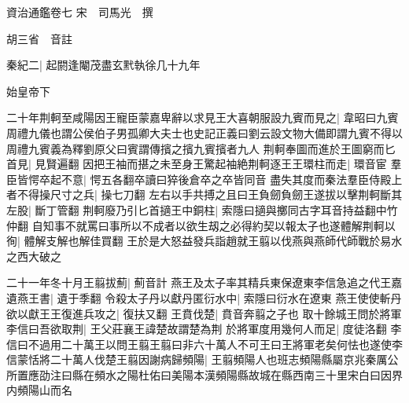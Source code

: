 資治通鑑卷七
宋　司馬光　撰

胡三省　音註

秦紀二|{
	起閼逢閹茂盡玄黓執徐几十九年}


始皇帝下

二十年荆軻至咸陽因王寵臣蒙嘉卑辭以求見王大喜朝服設九賓而見之|{
	韋昭曰九賓周禮九儀也謂公侯伯子男孤卿大夫士也史記正義曰劉云設文物大備即謂九賓不得以周禮九賓義為釋劉原父曰賓謂傳擯之擯九賓擯者九人}
荆軻奉圖而進於王圖窮而匕首見|{
	見賢遍翻}
因把王袖而揕之未至身王驚起袖絶荆軻逐王王環柱而走|{
	環音宦}
羣臣皆愕卒起不意|{
	愕五各翻卒讀曰猝後倉卒之卒皆同音}
盡失其度而秦法羣臣侍殿上者不得操尺寸之兵|{
	操七刀翻}
左右以手共搏之且曰王負劒負劒王遂拔以擊荆軻斷其左股|{
	斷丁管翻}
荆軻廢乃引匕首擿王中銅柱|{
	索隱曰擿與擲同古字耳音持益翻中竹仲翻}
自知事不就罵曰事所以不成者以欲生刼之必得約契以報太子也遂體解荆軻以徇|{
	體解支解也解佳買翻}
王於是大怒益發兵詣趙就王翦以伐燕與燕師代師戰於易水之西大破之

二十一年冬十月王翦拔薊|{
	薊音計}
燕王及太子率其精兵東保遼東李信急追之代王嘉遺燕王書|{
	遺于季翻}
令殺太子丹以獻丹匿衍水中|{
	索隱曰衍水在遼東}
燕王使使斬丹欲以獻王王復進兵攻之|{
	復扶又翻}
王賁伐楚|{
	賁音奔翦之子也}
取十餘城王問於將軍李信曰吾欲取荆|{
	王父莊襄王諱楚故謂楚為荆}
於將軍度用幾何人而足|{
	度徒洛翻}
李信曰不過用二十萬王以問王翦王翦曰非六十萬人不可王曰王將軍老矣何怯也遂使李信蒙恬將二十萬人伐楚王翦因謝病歸頻陽|{
	王翦頻陽人也班志頻陽縣屬京兆秦厲公所置應劭注曰縣在頻水之陽杜佑曰美陽本漢頻陽縣故城在縣西南三十里宋白曰因界内頻陽山而名}


